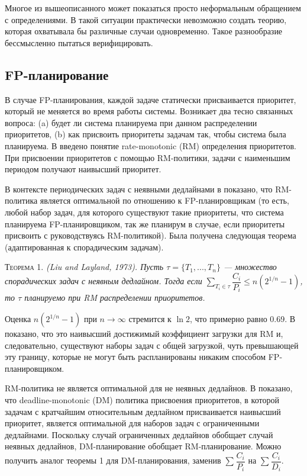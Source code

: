 Многое из вышеописанного может показаться просто неформальным обращением с определениями.
  В такой ситуации практически невозможно создать теорию, которая охватывала бы
  различные случаи одновременно. Такое разнообразие бессмысленно пытаться верифицировать.

\subsection{FP-планирование}

В случае FP-планирования, каждой задаче статически присваивается приоритет, который не меняется во время работы системы. Возникает два тесно связанных вопроса: (a) будет ли система планируема при данном распределении приоритетов, (b) как присвоить приоритеты задачам так, чтобы система была планируема. В \cite{Liu1973SchedulingAF} введено понятие rate-monotonic (RM) определения приоритетов. При присвоении приоритетов с помощью RM-политики, задачи с наименьшим периодом получают наивысший приоритет.


В контексте периодических задач с неявными дедлайнами в \cite{Liu1973SchedulingAF} показано, что RM-политика является оптимальной по отношению к FP-планировщикам (то есть, любой набор задач, для которого существуют такие приоритеты, что система планируема FP-планировщиком, так же планирум в случае, если приоритеты присвоить с руководствуясь RM-политикой). Была получена следующая теорема (адаптированная к спорадическим задачам).

\textsc{Теорема 1. }
\textit{(Liu and Layland, 1973). Пусть $\tau = \{T_1, ... , T_n\}$ --- множество спорадических задач с неявным дедлайном. Тогда если $\sum_{T_i \in \tau} \dfrac{C_i}{P_i} \leq n(2^{1/n} - 1)$, то $\tau$ планируемо при RM распределении приоритетов.
}

Оценка $n(2^{1/n} - 1)$ при $n \rightarrow \infty$ стремится к $\ln 2$, что примерно равно 0.69. В \cite{Liu1973SchedulingAF} показано, что это наивысший достижимый коэффициент загрузки для RM и, следовательно, существуют наборы задач с общей загрузкой, чуть превышающей эту границу, которые не могут быть распланированы никаким способом FP-планировщиком.

RM-политика не является оптимальной для не неявных дедлайнов. В \cite{LEUNG1982237} показано, что deadline-monotonic (DM) политика присвоения приоритетов, в которой задачам с кратчайшим относительным дедлайном присваивается наивысший приоритет, является оптимальной для наборов задач с ограниченными дедлайнами. Поскольку случай ограниченных дедлайнов обобщает случай неявных дедлайнов, DM-планирование обобщает RM-планирование. Можно получить аналог теоремы 1 для DM-планирования, заменив $\sum_{} \dfrac{C_i}{P_i}$ на $\sum_{} \dfrac{C_i}{D_i}$.

